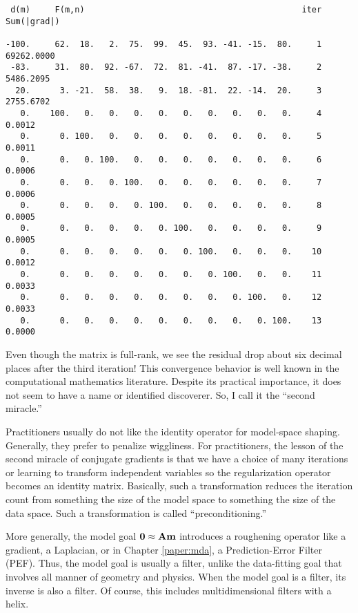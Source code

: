 \par\noindent
\footnotesize
\begin{verbatim}
 d(m)     F(m,n)                                            iter   Sum(|grad|)

-100.     62.  18.   2.  75.  99.  45.  93. -41. -15.  80.     1  69262.0000
 -83.     31.  80.  92. -67.  72.  81. -41.  87. -17. -38.     2   5486.2095
  20.      3. -21.  58.  38.   9.  18. -81.  22. -14.  20.     3   2755.6702
   0.    100.   0.   0.   0.   0.   0.   0.   0.   0.   0.     4      0.0012
   0.      0. 100.   0.   0.   0.   0.   0.   0.   0.   0.     5      0.0011
   0.      0.   0. 100.   0.   0.   0.   0.   0.   0.   0.     6      0.0006
   0.      0.   0.   0. 100.   0.   0.   0.   0.   0.   0.     7      0.0006
   0.      0.   0.   0.   0. 100.   0.   0.   0.   0.   0.     8      0.0005
   0.      0.   0.   0.   0.   0. 100.   0.   0.   0.   0.     9      0.0005
   0.      0.   0.   0.   0.   0.   0. 100.   0.   0.   0.    10      0.0012
   0.      0.   0.   0.   0.   0.   0.   0. 100.   0.   0.    11      0.0033
   0.      0.   0.   0.   0.   0.   0.   0.   0. 100.   0.    12      0.0033
   0.      0.   0.   0.   0.   0.   0.   0.   0.   0. 100.    13      0.0000
\end{verbatim}
\normalsize
\par\noindent
Even though the matrix is full-rank,
we see the residual drop about six decimal places after the third iteration!
This convergence behavior is well known
in the computational mathematics literature.
Despite its practical importance,
it does not seem to have a name or identified discoverer.
So, I call it the ``second miracle.''

\par
Practitioners usually do not like
the identity operator for model-space shaping.
Generally, they prefer to penalize wiggliness.
For practitioners,
the lesson of the second miracle of conjugate gradients
is that we have a choice of many iterations
or learning to transform
independent variables so
the regularization operator becomes an identity matrix.
Basically, such a transformation reduces the iteration count
from    something the size of the model space
to      something the size of the data space.
Such a transformation is called ``preconditioning.''

\par
More generally,
the model goal $\bold 0 \approx \bold A \bold m$
introduces a roughening operator like a gradient,
a Laplacian, or
in Chapter \ref{paper:mda},
a Prediction-Error Filter (PEF).
Thus, the model goal is usually a filter,
unlike the data-fitting goal
that involves all manner of geometry and physics.
When the model goal is a filter, its inverse is also a filter.
Of course, this includes multidimensional filters with a helix.


